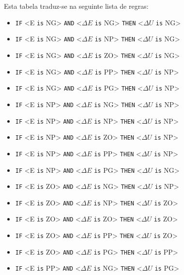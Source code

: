 \documentclass{article}
\begin{document}
Esta tabela traduz-se na seguinte lista de regras:
\begin{itemize}
	\item \texttt{IF} <E \texttt{is} NG> \texttt{AND} <$\Delta E$ \texttt{is} NG> \texttt{THEN} <$\Delta U$ \texttt{is} NG>
	\item \texttt{IF} <E \texttt{is} NG> \texttt{AND} <$\Delta E$ \texttt{is} NP> \texttt{THEN} <$\Delta U$ \texttt{is} NG>
	\item \texttt{IF} <E \texttt{is} NG> \texttt{AND} <$\Delta E$ \texttt{is} ZO> \texttt{THEN} <$\Delta U$ \texttt{is} NG>
	\item \texttt{IF} <E \texttt{is} NG> \texttt{AND} <$\Delta E$ \texttt{is} PP> \texttt{THEN} <$\Delta U$ \texttt{is} NP>
	\item \texttt{IF} <E \texttt{is} NG> \texttt{AND} <$\Delta E$ \texttt{is} PG> \texttt{THEN} <$\Delta U$ \texttt{is} NP>
	\item \texttt{IF} <E \texttt{is} NP> \texttt{AND} <$\Delta E$ \texttt{is} NG> \texttt{THEN} <$\Delta U$ \texttt{is} NP>
	\item \texttt{IF} <E \texttt{is} NP> \texttt{AND} <$\Delta E$ \texttt{is} NP> \texttt{THEN} <$\Delta U$ \texttt{is} NP>
	\item \texttt{IF} <E \texttt{is} NP> \texttt{AND} <$\Delta E$ \texttt{is} ZO> \texttt{THEN} <$\Delta U$ \texttt{is} NP>
	\item \texttt{IF} <E \texttt{is} NP> \texttt{AND} <$\Delta E$ \texttt{is} PP> \texttt{THEN} <$\Delta U$ \texttt{is} NP>
	\item \texttt{IF} <E \texttt{is} NP> \texttt{AND} <$\Delta E$ \texttt{is} PG> \texttt{THEN} <$\Delta U$ \texttt{is} NG>
	\item \texttt{IF} <E \texttt{is} ZO> \texttt{AND} <$\Delta E$ \texttt{is} NG> \texttt{THEN} <$\Delta U$ \texttt{is} NP>
	\item \texttt{IF} <E \texttt{is} ZO> \texttt{AND} <$\Delta E$ \texttt{is} NP> \texttt{THEN} <$\Delta U$ \texttt{is} ZO>
	\item \texttt{IF} <E \texttt{is} ZO> \texttt{AND} <$\Delta E$ \texttt{is} ZO> \texttt{THEN} <$\Delta U$ \texttt{is} ZO>
	\item \texttt{IF} <E \texttt{is} ZO> \texttt{AND} <$\Delta E$ \texttt{is} PP> \texttt{THEN} <$\Delta U$ \texttt{is} ZO>
	\item \texttt{IF} <E \texttt{is} ZO> \texttt{AND} <$\Delta E$ \texttt{is} PG> \texttt{THEN} <$\Delta U$ \texttt{is} PP>
	\item \texttt{IF} <E \texttt{is} PP> \texttt{AND} <$\Delta E$ \texttt{is} NG> \texttt{THEN} <$\Delta U$ \texttt{is} PG>

\end{itemize}
\end{document}
